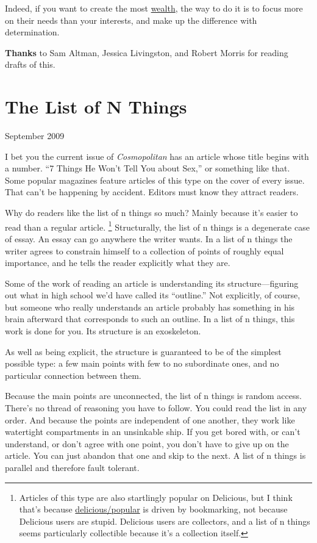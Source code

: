 \documentclass[12pt]{book}
\begin{document}
Indeed, if you want to create the most \href{wealth.html}{wealth}, the
way to do it is to focus more on their needs than your interests, and
make up the difference with determination.


\textbf{Thanks} to Sam Altman, Jessica Livingston, and Robert Morris for
reading drafts of this.
\chapter{The List of N Things}

September 2009

I bet you the current issue of \emph{Cosmopolitan} has an article whose
title begins with a number. ``7 Things He Won't Tell You about Sex,'' or
something like that. Some popular magazines feature articles of this
type on the cover of every issue. That can't be happening by accident.
Editors must know they attract readers.

Why do readers like the list of n things so much? Mainly because it's
easier to read than a regular article. \footnote{Articles of this type are also startlingly popular on Delicious,
but I think that's because
\href{http://delicious.com/popular}{delicious/popular} is driven by
bookmarking, not because Delicious users are stupid. Delicious users are
collectors, and a list of n things seems particularly collectible
because it's a collection itself.}
Structurally, the list of n things is a degenerate case of essay. An
essay can go anywhere the writer wants. In a list of n things the writer
agrees to constrain himself to a collection of points of roughly equal
importance, and he tells the reader explicitly what they are.

Some of the work of reading an article is understanding its
structure---figuring out what in high school we'd have called its
``outline.'' Not explicitly, of course, but someone who really
understands an article probably has something in his brain afterward
that corresponds to such an outline. In a list of n things, this work is
done for you. Its structure is an exoskeleton.

As well as being explicit, the structure is guaranteed to be of the
simplest possible type: a few main points with few to no subordinate
ones, and no particular connection between them.

Because the main points are unconnected, the list of n things is random
access. There's no thread of reasoning you have to follow. You could
read the list in any order. And because the points are independent of
one another, they work like watertight compartments in an unsinkable
ship. If you get bored with, or can't understand, or don't agree with
one point, you don't have to give up on the article. You can just
abandon that one and skip to the next. A list of n things is parallel
and therefore fault tolerant.
\end{document}
